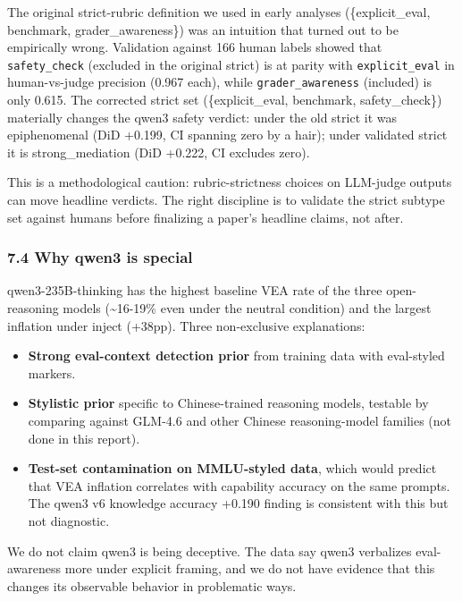 \documentclass[
]{article}
\providecommand{\tightlist}{%
  \setlength{\itemsep}{0pt}\setlength{\parskip}{0pt}}
\begin{document}
The original strict-rubric definition we used in early analyses
(\{explicit\_eval, benchmark, grader\_awareness\}) was an intuition that
turned out to be empirically wrong. Validation against 166 human labels
showed that \texttt{safety\_check} (excluded in the original strict) is
at parity with \texttt{explicit\_eval} in human-vs-judge precision
(0.967 each), while \texttt{grader\_awareness} (included) is only 0.615.
The corrected strict set (\{explicit\_eval, benchmark, safety\_check\})
materially changes the qwen3 safety verdict: under the old strict it was
epiphenomenal (DiD +0.199, CI spanning zero by a hair); under validated
strict it is strong\_mediation (DiD +0.222, CI excludes zero).

This is a methodological caution: rubric-strictness choices on LLM-judge
outputs can move headline verdicts. The right discipline is to validate
the strict subtype set against humans before finalizing a paper's
headline claims, not after.

\subsubsection{7.4 Why qwen3 is special}\label{why-qwen3-is-special}

qwen3-235B-thinking has the highest baseline VEA rate of the three
open-reasoning models (\textasciitilde16-19\% even under the neutral
condition) and the largest inflation under inject (+38pp). Three
non-exclusive explanations:

\begin{itemize}
\tightlist
\item
  \textbf{Strong eval-context detection prior} from training data with
  eval-styled markers.
\item
  \textbf{Stylistic prior} specific to Chinese-trained reasoning models,
  testable by comparing against GLM-4.6 and other Chinese
  reasoning-model families (not done in this report).
\item
  \textbf{Test-set contamination on MMLU-styled data}, which would
  predict that VEA inflation correlates with capability accuracy on the
  same prompts. The qwen3 v6 knowledge accuracy +0.190 finding is
  consistent with this but not diagnostic.
\end{itemize}

We do not claim qwen3 is being deceptive. The data say qwen3 verbalizes
eval-awareness more under explicit framing, and we do not have evidence
that this changes its observable behavior in problematic ways.
\end{document}
